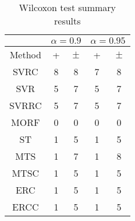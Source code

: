 \documentclass[a4paper,10pt]{article}
\begin{document}
\begin{table}[!htp]
\centering\scriptsize
\begin{tabular}{
|c|c|c|c|c|}
\hline
&\multicolumn{2}{c|}{$\alpha=0.9$} & \multicolumn{2}{c|}{$\alpha=0.95$}\\\hline
Method & + & $\pm$ & + & $\pm$ \\
\hline
SVRC & 8 & 8 & 7 & 8\\
\hline
SVR & 5 & 7 & 5 & 7\\
\hline
SVRRC & 5 & 7 & 5 & 7\\
\hline
MORF & 0 & 0 & 0 & 0\\
\hline
ST & 1 & 5 & 1 & 5\\
\hline
MTS & 1 & 7 & 1 & 8\\
\hline
MTSC & 1 & 5 & 1 & 5\\
\hline
ERC & 1 & 5 & 1 & 5\\
\hline
ERCC & 1 & 5 & 1 & 5\\
\hline

\end{tabular}
\caption{Wilcoxon test summary results}

\end{table}

 \clearpage 
\end{document}
